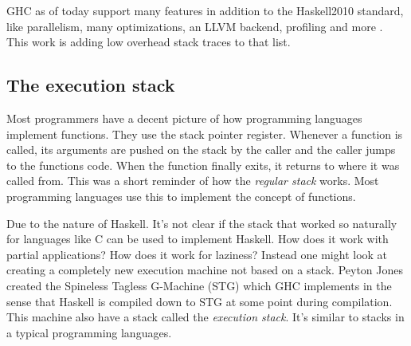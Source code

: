 GHC as of today support many features in addition to the Haskell2010
standard, like parallelism, many optimizations, an LLVM backend, profiling
and more \cite{ghc_website}. This
work is adding low overhead stack traces to that list.

\subsection{The execution stack}

Most programmers have a decent picture of how programming languages implement
functions. They use the stack pointer register. Whenever a function is called, its
arguments are pushed on the stack by the caller and the caller jumps to the
functions code. When the function finally exits, it returns to where it was
called from. This was a short reminder of how the \emph{regular stack} works.
Most programming languages use this to implement the concept of functions.

Due to the nature of Haskell. It's not clear if the stack that
worked so naturally for languages like C can be used to implement
Haskell. How does it work with partial applications? How does it
work for laziness? Instead one might look at creating a completely
new execution machine not based on a stack. Peyton Jones created the
Spineless Tagless G-Machine (STG) \cite{stg_1992} which GHC implements
\cite{evalapplyjfp06} in the sense that Haskell is compiled down to
STG at some point during compilation. This machine also have a stack
called the \emph{execution stack}. It's similar to stacks in a typical
programming languages.


